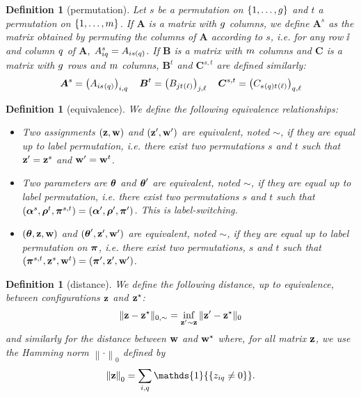 \documentclass[bj]{imsart}
\numberwithin{equation}{section}
\theoremstyle{plain}
\newtheorem{dof}[thm]{Definition}
\theoremstyle{remark}
\begin{document}
\begin{dof}[permutation]
  \label{def:permutation}
  Let $s$ be a permutation on $\{1,\dots,g\}$ and $t$ a permutation on $\{1,\dots,m\}$. If $\boldsymbol{A}$ is a matrix with $g$ columns, we define $\boldsymbol{A}^s$ as the matrix obtained by permuting the columns of $\boldsymbol{A}$ according to $s$, \emph{i.e.} for any row $\ii$ and column $q$ of $\boldsymbol{A}$, ${A}^s_{i q} = A_{i s(q)}$. If $\boldsymbol{B}$ is a matrix with $m$ columns and $\boldsymbol{C}$ is a matrix with $g$ rows and $m$ columns, $\boldsymbol{B}^t$ and $\boldsymbol{C}^{s,t}$ are defined similarly:
  \begin{equation*}
    \boldsymbol{A}^s = \left( A_{\ii s^{}(\kk)} \right)_{\ii,\kk} \quad  \boldsymbol{B}^t = \left( B_{\jj t^{}(\el)} \right)_{\jj, \el} \quad \boldsymbol{C}^{s,t} = \left( C_{s^{}(\kk) t^{}(\el)} \right)_{\kk,\el}
  \end{equation*}
\end{dof}

\begin{dof}[equivalence]
  \label{def:equivalence}
  We define the following equivalence relationships:
  \begin{itemize}
  \item Two assignments $(\mathbf{z}, \mathbf{w})$ and $(\mathbf{z}', \mathbf{w}')$ are \emph{equivalent}, noted $\sim$, if they are equal up to label permutation, \emph{i.e.} there exist two permutations $s$ and $t$ such that $\mathbf{z}' = \mathbf{z}^s$ and  $\mathbf{w}' = \mathbf{w}^t$.
  \item Two parameters are $\boldsymbol{\theta}$ and $\boldsymbol{\theta}'$ are \emph{equivalent}, noted $\sim$, if they are equal up to label permutation, \emph{i.e.} there exist two permutations $s$ and $t$ such that $(\boldsymbol{\alpha}^s, \boldsymbol{\rho}^t, \boldsymbol{\pi}^{s,t}) = (\boldsymbol{\alpha}', \boldsymbol{\rho}', \boldsymbol{\pi}')$. This is \emph{label-switching}.
  \item  $(\boldsymbol{\theta}, \mathbf{z}, \mathbf{w})$ and $(\boldsymbol{\theta}', \mathbf{z}', \mathbf{w}')$ are \emph{equivalent}, noted $\sim$, if they are equal up to label permutation on $\boldsymbol{\pi}$, \emph{i.e.} there exist two permutations, $s$ and $t$ such that $(\boldsymbol{\pi}^{s,t}, \mathbf{z}^s, \mathbf{w}^{t}) = (\boldsymbol{\pi}', \mathbf{z}', \mathbf{w}')$.
  \end{itemize}
\end{dof}

\begin{dof}[distance]
  \label{def:equivalence-distance}
  We define the following distance, up to equivalence, between configurations $\mathbf{z}$ and $\mathbf{z}^\star$:
    \begin{equation*}
    \|\bz - \bzs\|_{0, \sim} = \inf_{\bz' \sim \bz} \|\bz' - \bzs\|_0
    \end{equation*}
    and similarly for the distance between $\mathbf{w}$ and $\mathbf{w}^\star$ where, for all matrix $\mathbf{z}$, we use the Hamming norm $\left\|\cdot\right\|_{0}$ defined by
\[\left\|\bz\right\|_{0}=\sum_{\ii,\kk}{\mathds{1}{\left\{\zik\neq0\right\}}}.\]
\end{dof}
  
\end{document}
